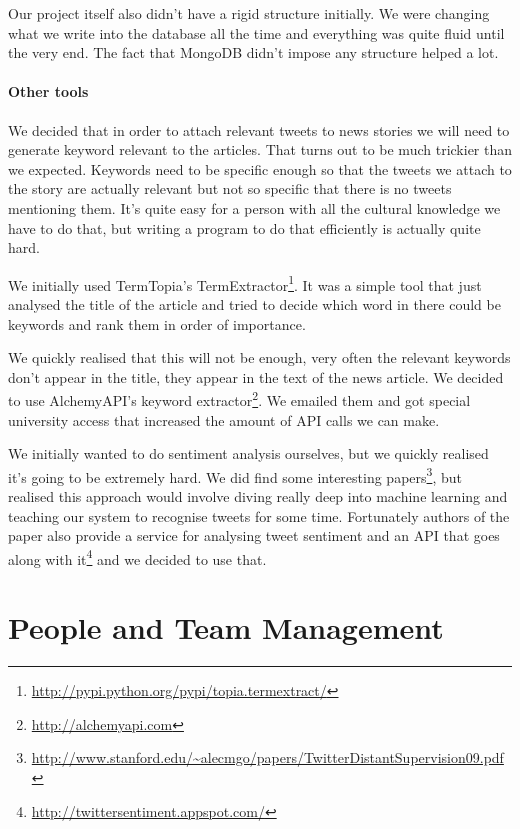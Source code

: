 \documentclass{report}
\begin{document}
		Our project itself also didn't have a rigid structure initially. We were changing what we write into the database all the time and everything was quite fluid until the very end. The fact that MongoDB didn't impose any structure helped a lot.
		
		\paragraph{Other tools} We decided that in order to attach relevant tweets to news stories we will need to generate keyword relevant to the articles. That turns out to be much trickier than we expected. Keywords need to be specific enough so that the tweets we attach to the story are actually relevant but not so specific that there is no tweets mentioning them. It's quite easy for a person with all the cultural knowledge we have to do that, but writing a program to do that efficiently is actually quite hard.
		
		We initially used TermTopia's TermExtractor\footnote{\url{http://pypi.python.org/pypi/topia.termextract/}}. It was a simple tool that just analysed the title of the article and tried to decide which word in there could be keywords and rank them in order of importance.
		
		We quickly realised that this will not be enough, very often the relevant keywords don't appear in the title, they appear in the text of the news article. We decided to use AlchemyAPI's keyword extractor\footnote{\url{http://alchemyapi.com}}. We emailed them and got special university access that increased the amount of API calls we can make.
		
		We initially wanted to do sentiment analysis ourselves, but we quickly realised it's going to be extremely hard. We did find some interesting papers\footnote{\url{http://www.stanford.edu/~alecmgo/papers/TwitterDistantSupervision09.pdf}}, but realised this approach would involve diving really deep into machine learning and teaching our system to recognise tweets for some time. Fortunately authors of the paper also provide a service for analysing tweet sentiment and an API that goes along with it\footnote{\url{http://twittersentiment.appspot.com/}} and we decided to use that.
	
	
		\section{People and Team Management}
\end{document}
